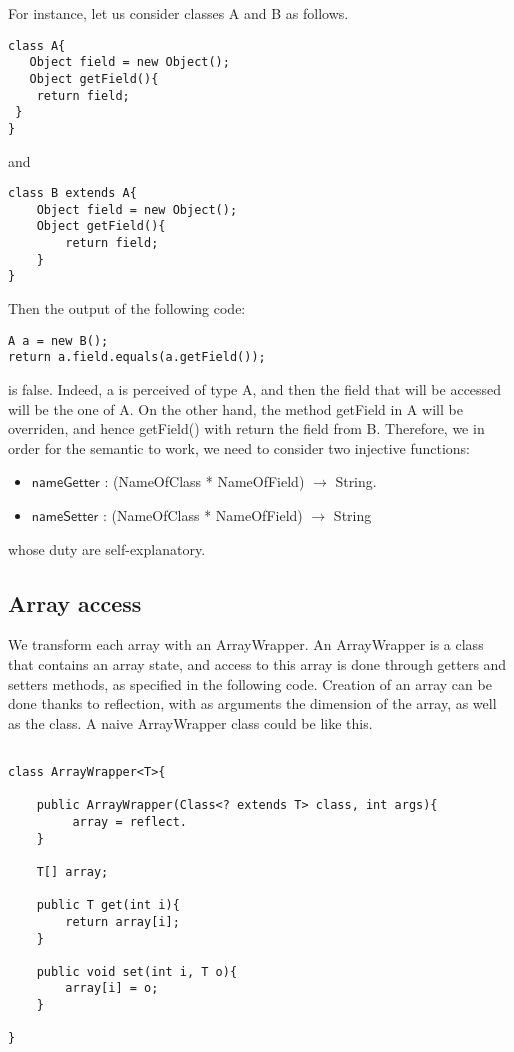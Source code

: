 \documentclass[a4paper, 11pt, english]{article}
\begin{document}
For instance, let us consider classes A and B as follows.
\begin{lstlisting}
class A{
   Object field = new Object();
   Object getField(){
 	return field; 
 }
}
\end{lstlisting}
and
\begin{lstlisting}
class B extends A{
	Object field = new Object();
	Object getField(){
		return field;
	}
}
\end{lstlisting}
Then the output of the following code:
\begin{lstlisting}
A a = new B();
return a.field.equals(a.getField());
\end{lstlisting}
is false. Indeed, a is perceived of type A, and then the field that will be accessed will be the one of A. On the other hand, the method getField in A will be overriden, and hence getField() with return the field from B.
Therefore, we in order for the semantic to work, we need to consider two injective functions:
\begin{itemize}
\item $\mathsf{nameGetter}$ : (NameOfClass * NameOfField) $\rightarrow$ String.
\item $\mathsf{nameSetter}$ : (NameOfClass * NameOfField) $\rightarrow$ String
\end{itemize}
whose duty are self-explanatory.

\subsection{Array access}

We transform each array with an ArrayWrapper. An ArrayWrapper is a class that contains an array state, and access to this array is done through getters and setters methods, as specified in the following code. Creation of an array can be done thanks to reflection, with as arguments the dimension of the array, as well as the class. A naive ArrayWrapper class could be like this.

\begin{lstlisting}

class ArrayWrapper<T>{
	
	public ArrayWrapper(Class<? extends T> class, int args){
		 array = reflect.
	}
	
	T[] array;
	
	public T get(int i){
		return array[i];
	}
	
	public void set(int i, T o){
		array[i] = o;
	}

}
\end{lstlisting}
\end{document}
